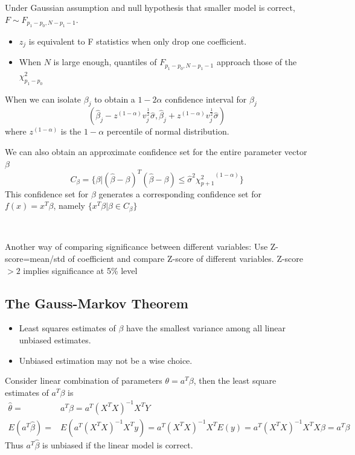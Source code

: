 Under Gaussian assumption and null hypothesis that smaller model is correct, 
$F\sim F_{p_1-p_0,N-p_1-1}$. 
\begin{itemize}
	\item $z_j$ is equivalent to F statistics when only drop one coefficient. 
    \item When $N$ is large enough, quantiles of $F_{p_1-p_0,N-p_1-1}$ approach those 
    of the $\chi^2_{p_1-p_0}$
\end{itemize}

When we can isolate $\beta_j$ to obtain a $1-2\alpha$ confidence interval for 
$\beta_j$
\begin{equation*}
    (\hat{\beta}_j-z^{(1-\alpha)}v_j^{\frac{1}{2}}\hat{\sigma}, 
    \hat{\beta}_j+z^{(1-\alpha)}v_j^{\frac{1}{2}}\hat{\sigma})
\end{equation*}
where $z^{(1-\alpha)}$ is the $1-\alpha$ percentile of normal distribution. 

We can also obtain an approximate confidence set for the entire parameter vector 
$\beta$
\begin{equation*}
    C_{\beta}=\{\beta|(\hat{\beta}-\beta)^T(\hat{\beta}-\beta)\le\hat{\sigma}^2 
    {\chi^2_{p+1}}^{(1-\alpha)} \}
\end{equation*}
This confidence set for $\beta$ generates a corresponding confidence set for 
$f(x)=x^T\beta$, namely $\{x^T\beta|\beta\in C_{\beta}\}$

~

Another way of comparing significance between different variables: Use 
Z-score=mean/std of coefficient and compare Z-score of different variables. 
Z-score$>2$ implies significance at 5\% level

\subsection{The Gauss-Markov Theorem}
\begin{itemize}
    \item Least squares estimates of $\beta$ have the smallest variance among all 
    linear unbiased estimates. 
	\item Unbiased estimation may not be a wise choice. 
\end{itemize}

Consider linear combination of parameters $\theta=a^T\beta$, then the least square 
estimates of $a^T\beta$ is
\begin{align*}
	\hat{\theta}=&a^T\hat{\beta}=a^T(X^TX)^{-1}X^TY\\
    E(a^T\hat{\beta})=&E(a^T(X^TX)^{-1}X^Ty)=
    a^T(X^TX)^{-1}X^TE(y)=a^T(X^TX)^{-1}X^TX\beta=a^T\beta
\end{align*}
Thus $a^T\hat{\beta}$ is unbiased if the linear model is correct. 

